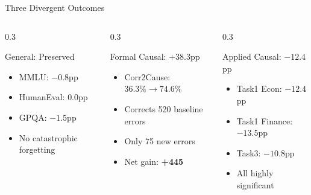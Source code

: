 \documentclass[aspectratio=169,12pt]{beamer}
\begin{document}
\begin{frame}{Three Divergent Outcomes}
  \begin{columns}[T]
    \begin{column}{0.3\textwidth}
      \begin{block}{General: Preserved}
        \begin{itemize}
          \item MMLU: $-0.8$pp
          \item HumanEval: $0.0$pp
          \item GPQA: $-1.5$pp
          \item No catastrophic forgetting
        \end{itemize}
      \end{block}
    \end{column}
    \begin{column}{0.3\textwidth}
      \begin{block}{Formal Causal: $+38.3$pp}
        \begin{itemize}
          \item Corr2Cause: $36.3\% \to 74.6\%$
          \item Corrects 520 baseline errors
          \item Only 75 new errors
          \item Net gain: \textbf{+445}
        \end{itemize}
      \end{block}
    \end{column}
    \begin{column}{0.3\textwidth}
      \begin{block}{Applied Causal: $-12.4$pp}
        \begin{itemize}
          \item Task1 Econ: $-12.4$pp
          \item Task1 Finance: $-13.5$pp
          \item Task3: $-10.8$pp
          \item All highly significant
        \end{itemize}
      \end{block}
    \end{column}
  \end{columns}

\end{frame}
\end{document}
